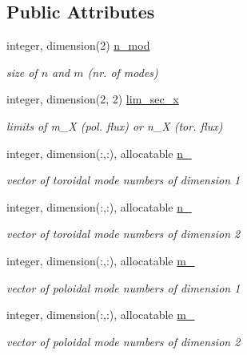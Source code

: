 \subsection*{Public Attributes}
\begin{DoxyCompactItemize}
\item 
integer, dimension(2) \hyperlink{structx__vars_1_1x__2__type_a87efa10d03a1570fca946a56f7af7b25}{n\+\_\+mod}
\begin{DoxyCompactList}\small\item\em size of $n$ and $m$ (nr. of modes) \end{DoxyCompactList}\item 
integer, dimension(2, 2) \hyperlink{structx__vars_1_1x__2__type_aac1744d056531f6fe7f7426dd4fcd92b}{lim\+\_\+sec\+\_\+x}
\begin{DoxyCompactList}\small\item\em limits of {\ttfamily m\+\_\+X} (pol. flux) or {\ttfamily n\+\_\+X} (tor. flux) \end{DoxyCompactList}\item 
integer, dimension(\+:,\+:), allocatable \hyperlink{structx__vars_1_1x__2__type_afd547fbb0050babada1f7c82017b7513}{n\+\_}
\begin{DoxyCompactList}\small\item\em vector of toroidal mode numbers of dimension 1 \end{DoxyCompactList}\item 
integer, dimension(\+:,\+:), allocatable \hyperlink{structx__vars_1_1x__2__type_a8b82d06227f2a27e19f5d5e08e11c95b}{n\+\_}
\begin{DoxyCompactList}\small\item\em vector of toroidal mode numbers of dimension 2 \end{DoxyCompactList}\item 
integer, dimension(\+:,\+:), allocatable \hyperlink{structx__vars_1_1x__2__type_a024dedf39f2364d4593fe1bc0c195b10}{m\+\_}
\begin{DoxyCompactList}\small\item\em vector of poloidal mode numbers of dimension 1 \end{DoxyCompactList}\item 
integer, dimension(\+:,\+:), allocatable \hyperlink{structx__vars_1_1x__2__type_ae90b6e85d81ec3d3b39488a565512338}{m\+\_}
\begin{DoxyCompactList}\small\item\em vector of poloidal mode numbers of dimension 2 \end{DoxyCompactList}\item 

\end{DoxyCompactItemize}
